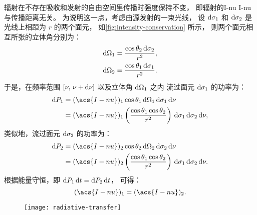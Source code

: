 辐射在不存在吸收和发射的自由空间里传播时强度保持不变，
即辐射的\acl*{I-nu} \acs*{I-nu} 与传播距离无关。
为说明这一点，考虑由源发射的一束光线，
设 $\mathrm{d}\sigma_1$ 和 $\mathrm{d}\sigma_2$ 是光线上相距为 $r$ 的两个面元，
如\autoref{fig:intensity-conservation} 所示，
则两个面元相互所张的立体角分别为：
\begin{align}
  \mathrm{d}\Omega_1 & = \frac{\cos\theta_2 \,\mathrm{d}\sigma_2}{r^2} , \\
  \mathrm{d}\Omega_2 & = \frac{\cos\theta_1 \,\mathrm{d}\sigma_1}{r^2} .
\end{align}
于是，在频率范围 $[\nu, \,\nu+\mathrm{d}\nu]$ 以及立体角 $\mathrm{d}\Omega_1$ 之内
流过面元 $\mathrm{d}\sigma_1$ 的功率为：
\begin{align}
  \D{P_1} & = (\acs{I-nu})_1 \cos\theta_1
      \,\D{\Omega_1} \,\D{\sigma_1} \,\D{\nu}  \\
    & = (\acs{I-nu})_1 \left( \frac{\cos\theta_1 \cos\theta_2}{r^2} \right)
      \,\D{\sigma_1} \,\D{\sigma_2} \,\D{\nu} ,
\end{align}
类似地，流过面元 $\mathrm{d}\sigma_2$ 的功率为：
\begin{align}
  \D{P_2} & = (\acs{I-nu})_2 \cos\theta_2
      \,\D{\Omega_2} \,\D{\sigma_2} \,\D{\nu}  \\
    & = (\acs{I-nu})_2 \left( \frac{\cos\theta_1 \cos\theta_2}{r^2} \right)
      \,\D{\sigma_1} \,\D{\sigma_2} \,\D{\nu} .
\end{align}
根据能量守恒，即 $\mathrm{d}P_1\,\mathrm{d}t = \mathrm{d}P_2\,\mathrm{d}t$，
可得：
\begin{equation}
  \label{eq:intensity-conservation}
  (\acs{I-nu})_1 = (\acs{I-nu})_2 .
\end{equation}

\begin{figure}[htp]
  \centering
  \texttt{[image: radiative-transfer]}
  \label{fig:radiative-transfer}
\end{figure}


